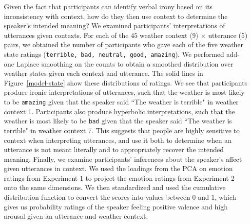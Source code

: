 \documentclass[10pt,letterpaper]{article}
\begin{document}


Given the fact that participants can identify verbal irony based on its inconsistency with context, how do they then use context to determine the speaker's intended meaning? We examined participants' interpretations of utterances given contexts. For each of the $45$ weather context (9) $\times$ utterance (5) pairs, we obtained the number of participants who gave each of the five weather state ratings (\texttt{terrible, bad, neutral, good, amazing}). We performed add-one Laplace smoothing on the counts to obtain a smoothed distribution over weather states given each context and utterance. The solid lines in Figure~\ref{model-state} show these distributions of ratings. We see that participants produce ironic interpretations of utterances, such that the weather is most likely to be \texttt{amazing} given that the speaker said ``The weather is terrible" in weather context 1. Participants also produce hyperbolic interpretations, such that the weather is most likely to be \texttt{bad} given that the speaker said ``The weather is terrible" in weather context 7. This suggests that people are highly sensitive to context when interpreting utterances, and use it both to determine when an utterance is not meant literally and to appropriately recover the intended meaning. 
%
Finally, we examine participants' inferences about the speaker's affect given utterances in context. We used the loadings from the PCA on emotion ratings from Experiment 1 to project the emotion ratings from Experiment 2 onto the same dimensions. We then standardized and used the cumulative distribution function to convert the scores into values between $0$ and $1$, which gives us probability ratings of the speaker feeling positive valence and high arousal given an utterance and weather context.
\end{document}

